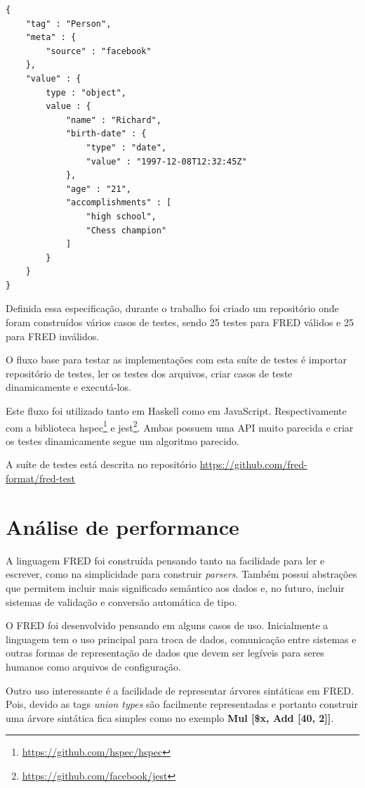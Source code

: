 \begin{lstlisting}[caption=Exemplo de JSON no formato de testes ,label={lst:testjson}]
{
    "tag" : "Person",
    "meta" : {
        "source" : "facebook"
    },
    "value" : {
        type : "object",
        value : {
            "name" : "Richard",
            "birth-date" : {
                "type" : "date",
                "value" : "1997-12-08T12:32:45Z"
            },
            "age" : "21", 
            "accomplishments" : [
                "high school",
                "Chess champion"
            ]
        }
    }
}
\end{lstlisting}
    
Definida essa especificação, durante o trabalho foi criado um repositório onde
foram construídos vários casos de testes, sendo 25 testes para FRED válidos
e 25 para FRED inválidos.

O fluxo base para testar as implementações com esta suíte de testes é 
importar repositório de testes, ler os testes dos arquivos, criar 
casos de teste dinamicamente e executá-los.

Este fluxo foi utilizado tanto em Haskell como em JavaScript. Respectivamente
com a biblioteca hspec\footnote{\url{https://github.com/hspec/hspec}} e 
jest\footnote{\url{https://github.com/facebook/jest}}.
Ambas possuem uma API muito parecida e criar os testes dinamicamente segue 
um algoritmo parecido.

A suíte de testes está descrita no 
repositório \url{https://github.com/fred-format/fred-test}

\section{Análise de performance}

A linguagem FRED foi construída pensando tanto na facilidade para ler e escrever, como na
simplicidade para construir \textit{parsers}. Também possui abstrações que permitem incluir
mais significado semântico aos dados e, no futuro, incluir sistemas de validação e conversão
automática de tipo. 

O FRED foi desenvolvido pensando em alguns casos de uso. Inicialmente a linguagem
tem o uso principal para troca de dados, comunicação entre sistemas e
outras formas de representação de dados que devem ser legíveis para seres humanos
como arquivos de configuração.

Outro uso interessante é a facilidade de representar árvores sintáticas em FRED.
Pois, devido as tags \textit{union types} são facilmente representadas 
e portanto construir uma árvore sintática fica simples como no exemplo
\textbf{Mul [\$x, Add [40, 2]]}.

